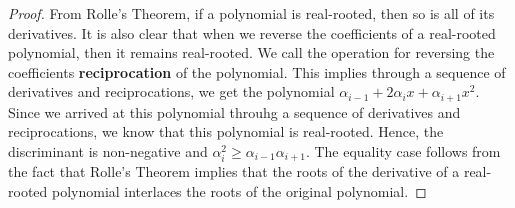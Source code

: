 \documentclass{puthesis-UG}
\begin{document}
\begin{proof}
	From Rolle's Theorem, if a polynomial is real-rooted, then so is all of its derivatives. It is also clear that when we reverse the coefficients of a real-rooted polynomial, then it remains real-rooted. We call the operation for reversing the coefficients \textbf{reciprocation} of the polynomial. This implies through a sequence of derivatives and reciprocations, we get the polynomial $\alpha_{i-1} + 2\alpha_i x + \alpha_{i+1} x^2$. Since we arrived at this polynomial throuhg a sequence of derivatives and reciprocations, we know that this polynomial is real-rooted. Hence, the discriminant is non-negative and $\alpha_i^2 \geq \alpha_{i-1} \alpha_{i+1}$. The equality case follows from the fact that Rolle's Theorem implies that the roots of the derivative of a real-rooted polynomial interlaces the roots of the original polynomial. 
\end{proof}
\end{document}
